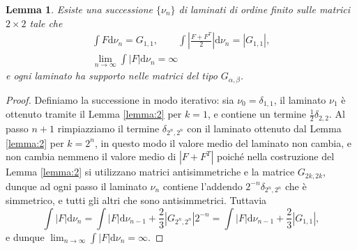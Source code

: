 \documentclass[a4paper,11pt]{book}
\theoremstyle{plain}
\newtheorem{lemma}[teo]{Lemma}
\theoremstyle{definition}
\theoremstyle{remark}
\newcommand{\diff}{\text{d}}
\begin{document}
\begin{lemma}\label{lemma:3}
	Esiste una successione $\{\nu_{n}\}$ di laminati di ordine finito sulle matrici $2\times 2$ tale che
	\begin{gather*}
		\int F\diff\nu_n = G_{1,1},\qquad\int\left|\frac{F+F^T}{2} \right|\diff\nu_n = |G_{1,1}|,\\
		\lim_{n\to\infty}\int|F|\diff\nu_{n} = \infty
	\end{gather*}
	e ogni laminato ha supporto nelle matrici del tipo $G_{\alpha,\beta}$.
\end{lemma}
\begin{proof}
	Definiamo la successione in modo iterativo: sia $\nu_0=\delta_{1,1}$, il laminato $\nu_1$ è ottenuto tramite il Lemma \ref{lemma:2} per $k=1$, e contiene un termine $\frac{1}{2}\delta_{2,2}$. Al passo $n+1$ rimpiazziamo il termine $\delta_{2^n,2^n}$ con il laminato ottenuto dal Lemma \ref{lemma:2} per $k=2^n$, in questo modo il valore medio del laminato non cambia, e non cambia nemmeno il valore medio di $|F+F^T|$ poiché nella costruzione del Lemma \ref{lemma:2} si utilizzano matrici antisimmetriche e la matrice $G_{2k,2k}$, dunque ad ogni passo il laminato $\nu_{n}$ contiene l'addendo $2^{-n}\delta_{2^{n},2^{n}}$ che è simmetrico, e tutti gli altri che sono antisimmetrici. Tuttavia
	\begin{equation}\label{eq:4}
		\int|F|\diff\nu_n = \int|F|\diff\nu_{n-1}+\frac{2}{3}|G_{2^n,2^n}|2^{-n} = \int|F|\diff\nu_{n-1}+\frac{2}{3}|G_{1,1}|,
	\end{equation}
	e dunque $\displaystyle \lim_{n\to\infty}\int|F|\diff\nu_{n}=\infty$.
\end{proof}
\end{document}
